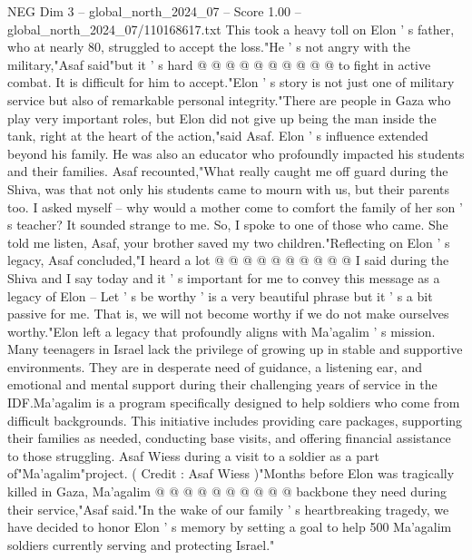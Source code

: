 \begin{textsample}{NEG Dim 3 – global\_north\_2024\_07 – Score 1.00 – global\_north\_2024\_07/110168617.txt}
This took a heavy toll on Elon ' s father, who at nearly 80, struggled to accept the loss."He ' s not angry with the military,"Asaf said"but it ' s hard @ @ @ @ @ @ @ @ @ @ to fight in active combat.
It is difficult for him to accept."Elon ' s story is not just one of military service but also of remarkable personal integrity."There are people in Gaza who play very important roles, but Elon did not give up being the man inside the tank, right at the heart of the action,"said Asaf.
Elon ' s influence extended beyond his family.
He was also an educator who profoundly impacted his students and their families.
Asaf recounted,"What really caught me off guard during the Shiva, was that not only his students came to mourn with us, but their parents too.
I asked myself -- why would a mother come to comfort the family of her son ' s teacher?
It sounded strange to me.
So, I spoke to one of those who came.
She told me listen, Asaf, your brother saved my two children."Reflecting on Elon ' s legacy, Asaf concluded,"I heard a lot @ @ @ @ @ @ @ @ @ @ I said during the Shiva and I say today and it ' s important for me to convey this message as a legacy of Elon -- Let ' s be worthy ' is a very beautiful phrase but it ' s a bit passive for me.
That is, we will not become worthy if we do not make ourselves worthy."Elon left a legacy that profoundly aligns with Ma'agalim ' s mission.
Many teenagers in Israel lack the privilege of growing up in stable and supportive environments.
They are in desperate need of guidance, a listening ear, and emotional and mental support during their challenging years of service in the IDF.Ma'agalim is a program specifically designed to help soldiers who come from difficult backgrounds.
This initiative includes providing care packages, supporting their families as needed, conducting base visits, and offering financial assistance to those struggling.
Asaf Wiess during a visit to a soldier as a part of"Ma'agalim"project. ( Credit : Asaf Wiess )"Months before Elon was tragically killed in Gaza, Ma'agalim @ @ @ @ @ @ @ @ @ @ backbone they need during their service,"Asaf said."In the wake of our family ' s heartbreaking tragedy, we have decided to honor Elon ' s memory by setting a goal to help 500 Ma'agalim soldiers currently serving and protecting Israel."

\end{textsample}
